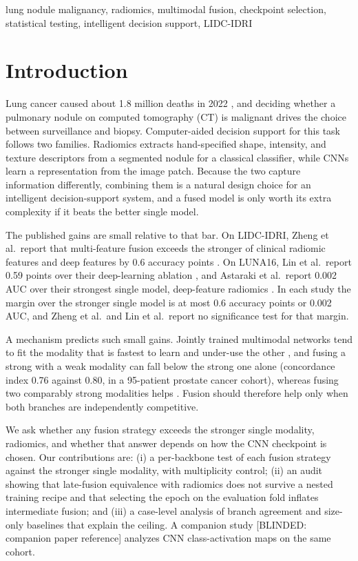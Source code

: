 \documentclass[conference]{IEEEtran}
\begin{document}
\begin{IEEEkeywords}
lung nodule malignancy, radiomics, multimodal fusion, checkpoint selection, statistical testing, intelligent decision support, LIDC-IDRI
\end{IEEEkeywords}

\section{Introduction}\label{sec:intro}

Lung cancer caused about 1.8 million deaths in 2022 \cite{bray_globocan_2024}, and deciding whether a pulmonary nodule on computed tomography (CT) is malignant drives the choice between surveillance and biopsy. Computer-aided decision support for this task follows two families. Radiomics extracts hand-specified shape, intensity, and texture descriptors from a segmented nodule for a classical classifier, while CNNs learn a representation from the image patch. Because the two capture information differently, combining them is a natural design choice for an intelligent decision-support system, and a fused model is only worth its extra complexity if it beats the better single model.

The published gains are small relative to that bar. On LIDC-IDRI, Zheng et al.\ report that multi-feature fusion exceeds the stronger of clinical radiomic features and deep features by 0.6 accuracy points \cite{zheng_multilevel_2026}. On LUNA16, Lin et al.\ report 0.59 points over their deep-learning ablation \cite{lin_combined_2024}, and Astaraki et al.\ report 0.002 AUC over their strongest single model, deep-feature radiomics \cite{astaraki_comparative_2021}. In each study the margin over the stronger single model is at most 0.6 accuracy points or 0.002 AUC, and Zheng et al.\ and Lin et al.\ report no significance test for that margin.

A mechanism predicts such small gains. Jointly trained multimodal networks tend to fit the modality that is fastest to learn and under-use the other \cite{wu_greedy_2022}, and fusing a strong with a weak modality can fall below the strong one alone (concordance index 0.76 against 0.80, in a 95-patient prostate cancer cohort), whereas fusing two comparably strong modalities helps \cite{chang_synergy_2025}. Fusion should therefore help only when both branches are independently competitive.

We ask whether any fusion strategy exceeds the stronger single modality, radiomics, and whether that answer depends on how the CNN checkpoint is chosen. Our contributions are: (i) a per-backbone test of each fusion strategy against the stronger single modality, with multiplicity control; (ii) an audit showing that late-fusion equivalence with radiomics does not survive a nested training recipe and that selecting the epoch on the evaluation fold inflates intermediate fusion; and (iii) a case-level analysis of branch agreement and size-only baselines that explain the ceiling. A companion study [BLINDED: companion paper reference] analyzes CNN class-activation maps on the same cohort.
\end{document}
